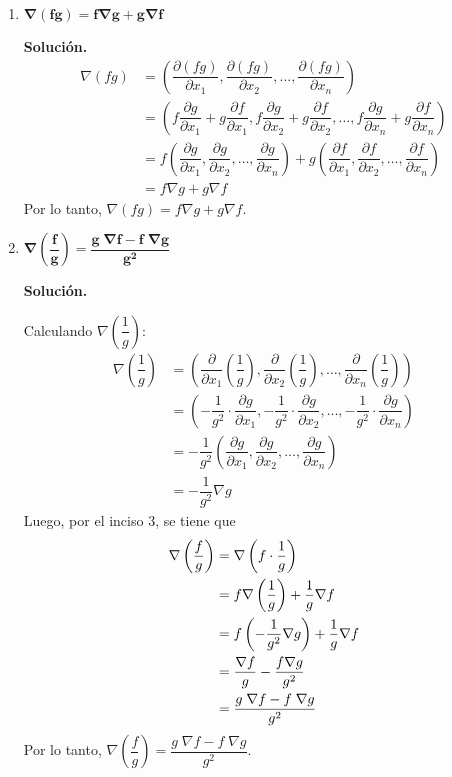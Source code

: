 \documentclass[fleqn, 12pt]{article}
\newcommand{\derivadaparcial}[2]{\dfrac{\partial {#1}}{\partial {#2}}}
\begin{document}
\begin{enumerate}
        \item $ \mathbf{\nabla (fg) = f \nabla g + g \nabla f} $
        
        \textbf{Solución.}
        \begin{align*}
            \nabla (fg) &= \left( \derivadaparcial{(fg)}{x_1}, \derivadaparcial{(fg)}{x_2}, \ldots , \derivadaparcial{(fg)}{x_n} \right) \\
            &= \left( f \derivadaparcial{g}{x_1} + g \derivadaparcial{f}{x_1}, f \derivadaparcial{g}{x_2} + g \derivadaparcial{f}{x_2}, \ldots , f \derivadaparcial{g}{x_n} + g \derivadaparcial{f}{x_n} \right) \\
            &= f \left( \derivadaparcial{g}{x_1}, \derivadaparcial{g}{x_2}, \ldots , \derivadaparcial{g}{x_n} \right) + g \left( \derivadaparcial{f}{x_1}, \derivadaparcial{f}{x_2}, \ldots , \derivadaparcial{f}{x_n} \right) \\
            &= f \nabla g + g \nabla f
        \end{align*}
        Por lo tanto, $ \nabla (fg) = f \nabla g + g \nabla f $.
        
        \item $ \mathbf{\nabla \left( \dfrac{f}{g} \right) = \dfrac{g \; \nabla f - f \; \nabla g}{g^2}} $
        
        \textbf{Solución.}

        Calculando $ \nabla \left( \dfrac{1}{g} \right) $:
        \begin{align*}
            \nabla \left( \dfrac{1}{g} \right) &= \left( \derivadaparcial{}{x_1} \left( \dfrac{1}{g} \right), \derivadaparcial{}{x_2} \left( \dfrac{1}{g} \right), \ldots , \derivadaparcial{}{x_n} \left( \dfrac{1}{g} \right) \right) \\
            &= \left( - \dfrac{1}{g^2} \cdot \derivadaparcial{g}{x_1}, - \dfrac{1}{g^2} \cdot \derivadaparcial{g}{x_2}, \ldots , - \dfrac{1}{g^2} \cdot \derivadaparcial{g}{x_n} \right) \\
            &= - \dfrac{1}{g^2} \left( \derivadaparcial{g}{x_1}, \derivadaparcial{g}{x_2}, \ldots , \derivadaparcial{g}{x_n} \right) \\
            &= - \dfrac{1}{g^2} \nabla g
        \end{align*}
        Luego, por el inciso 3, se tiene que
        \begin{align*}
            \nabla \left( \dfrac{f}{g} \right) &= \nabla \left( f \cdot \dfrac{1}{g} \right) \\
            &= f \nabla \left( \dfrac{1}{g} \right) + \dfrac{1}{g} \nabla f \\
            &= f \left( - \dfrac{1}{g^2} \nabla g \right) + \dfrac{1}{g} \nabla f \hfill \\
            &= \dfrac{\nabla f}{g} - \dfrac{f \nabla g}{g^2} \\
            &= \dfrac{g \; \nabla f - f \; \nabla g}{g^2}
        \end{align*}
        Por lo tanto, $ \nabla \left( \dfrac{f}{g} \right) = \dfrac{g \; \nabla f - f \; \nabla g}{g^2} $. \\


\end{enumerate}
\end{document}
